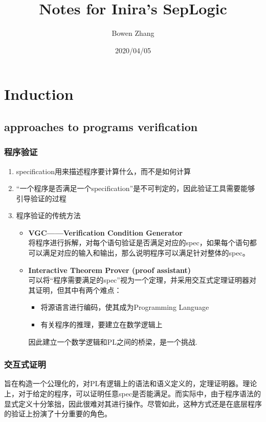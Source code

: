 \documentclass[a4paper,11pt]{article}
\title{Notes for Inira's SepLogic}
\author{Bowen Zhang}
\date{2020/04/05}
\begin{document}
	\maketitle
\section{Induction}
\subsection{approaches to programs verification}

	\subsubsection{程序验证}
	\begin{enumerate}
	\item specification用来描述程序要计算什么，而不是如何计算
	\item “一个程序是否满足一个specification”是不可判定的，因此验证工具需要能够引导验证的过程
	\item 程序验证的传统方法
		\begin{itemize}
		\item	\textbf{VGC——Verification Condition Generator}
		\\将程序进行拆解，对每个语句验证是否满足对应的spec，如果每个语句都可以满足对应的输入和输出，那么说明程序可以满足针对整体的spec。
		\item \textbf{Interactive Theorem Prover (proof assistant)}
		\\ 可以将“程序需要满足的spec”视为一个定理，并采用交互式定理证明器对其证明，但其中有两个难点：
			\begin{itemize}
			\item 将源语言进行编码，使其成为Programming Language
			\item 有关程序的推理，要建立在数学逻辑上
			\end{itemize}
		因此建立一个数学逻辑和PL之间的桥梁，是一个挑战.
		\end{itemize}
	\end{enumerate}
\subsubsection{交互式证明}
	旨在构造一个公理化的，对PL有逻辑上的语法和语义定义的，定理证明器。理论上，对于给定的程序，可以证明任意spec是否能满足。而实际中，由于程序语法的显式定义十分笨拙，因此很难对其进行操作。尽管如此，这种方式还是在底层程序的验证上扮演了十分重要的角色。
	
\end{document}
